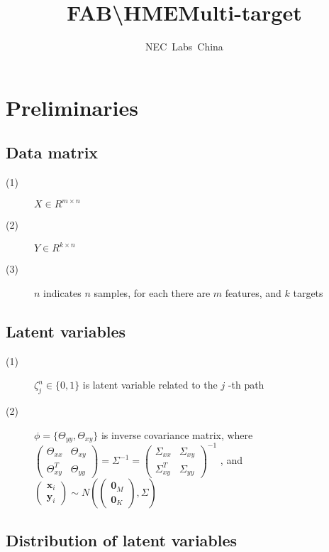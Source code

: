 \documentclass{article}
\begin{document}
\title{FAB\textbackslash HME\quad Multi-target}
\author{NEC\ Labs\ China}
\maketitle

\section{Preliminaries}
\subsection{Data matrix}
\begin{description}
\item[(1)] $X\in R^{m\times n} $
\item[(2)] $Y\in R^{k\times n} $
\item[(3)] $n$ indicates $n$ samples, for each there are $m$ features, and $k$ targets
\end{description}

\subsection{Latent variables}
\begin{description}
\item[(1)] $ \zeta_j^n \in \{ 0,1\} $ is latent variable related to the $j$ -th path
\item[(2)] $ \phi = \{\Theta_{yy} ,\Theta_{xy}\}$ is inverse covariance matrix, 
	where $\begin{pmatrix} 	\Theta_{xx} & \Theta_{xy} \\
		\Theta_{xy}^T & \Theta_{yy}
	\end{pmatrix} = \Sigma^{-1} = \begin{pmatrix}
	\Sigma_{xx} & \Sigma_{xy} \\
	\Sigma_{xy}^T & \Sigma_{yy}
	\end{pmatrix}^{-1}$ , and \\ $ \begin{pmatrix}
	\textbf{x}_i  \\
	\textbf{y}_i 
	\end{pmatrix} \sim N\left(\begin{pmatrix}
	\textbf{0}_M  \\
	\textbf{0}_K 
	\end{pmatrix}, \Sigma\right) $
	\end{description}

\subsection{Distribution of latent variables}
\end{document}
